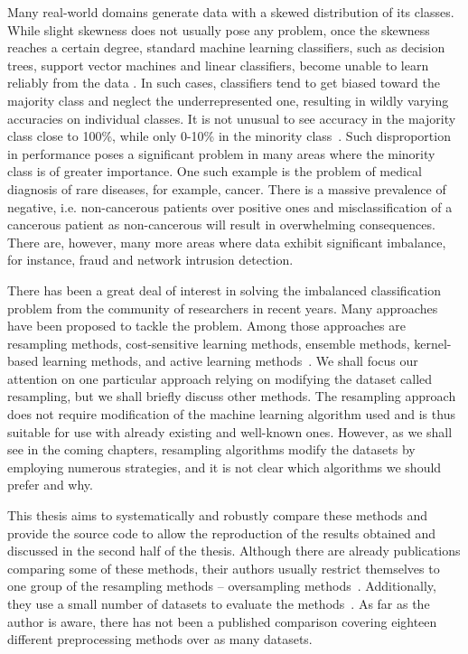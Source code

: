 
Many real-world domains generate data with a skewed distribution of its classes. While slight
skewness does not usually pose any problem, once the skewness reaches a certain degree, standard
machine learning classifiers, such as decision trees, support vector machines and linear
classifiers, become unable to learn reliably from the data \cite{learning-from-imb-data}. In such
cases, classifiers tend to get biased toward the majority class and neglect the underrepresented
one, resulting in wildly varying accuracies on individual classes. It is not unusual to see
accuracy in the majority class close to 100\%, while only 0-10\% in the minority
class~\cite{learning-from-imb-data}. Such disproportion in performance poses a significant problem
in many areas where the minority class is of greater importance. One such example is the problem of
medical diagnosis of rare diseases, for example, cancer. There is a massive prevalence of negative,
i.e. non-cancerous patients over positive ones and misclassification of a cancerous patient as
non-cancerous will result in overwhelming consequences. There are, however, many more areas where
data exhibit significant imbalance, for instance, fraud and network intrusion detection.

There has been a great deal of interest in solving the imbalanced classification problem from the
community of researchers in recent years. Many approaches have been proposed to tackle the problem.
Among those approaches are resampling methods, cost-sensitive learning methods, ensemble methods,
kernel-based learning methods, and active learning methods~\cite{learning-from-imb-data,
gosain2017}. We shall focus our attention on one particular approach relying on modifying the
dataset called resampling, but we shall briefly discuss other methods. The resampling approach does
not require modification of the machine learning algorithm used and is thus suitable for use with
already existing and well-known ones. However, as we shall see in the coming chapters, resampling
algorithms modify the datasets by employing numerous strategies, and it is not clear which
algorithms we should prefer and why.

This thesis aims to systematically and robustly compare these methods and provide the source code
to allow the reproduction of the results obtained and discussed in the second half of the thesis.
Although there are already publications comparing some of these methods, their authors usually
restrict themselves to one group of the resampling methods – oversampling methods~\cite{gosain2017,
amin2016}. Additionally, they use a small number of datasets to evaluate the
methods~\cite{gosain2017, amin2016, barandela2004}. As far as the author is aware, there has not
been a published comparison covering eighteen different preprocessing methods over as many
datasets.

